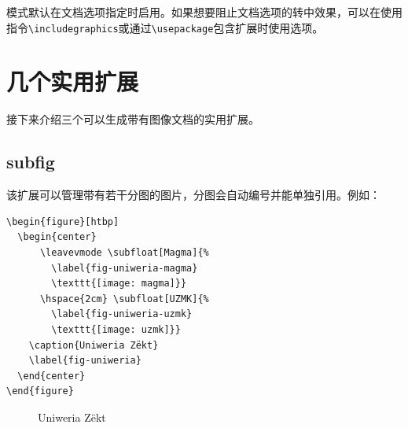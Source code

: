 模式默认在文档选项指定时启用。如果想要阻止文档选项的转中效果，可以在使用指令\verb|\includegraphics|或通过\verb|\usepackage|包含扩展时使用选项。

\section{几个实用扩展}

接下来介绍三个可以生成带有图像文档的实用扩展。

\subsection{\textsf{subfig}}

该扩展可以管理带有若干分图的图片，分图会自动编号并能单独引用。例如：

\begin{dmd}
\begin{verbatim}
\begin{figure}[htbp]
  \begin{center}
      \leavevmode \subfloat[Magma]{%
        \label{fig-uniweria-magma}
        \texttt{[image: magma]}}
      \hspace{2cm} \subfloat[UZMK]{%
        \label{fig-uniweria-uzmk}
        \texttt{[image: uzmk]}}
    \caption{Uniweria Zëkt}
    \label{fig-uniweria}
  \end{center}
\end{figure}
\end{verbatim}
\end{dmd}

\begin{figure}[htbp]
  \begin{center}
      \leavevmode {}
      \hspace{2cm} 
    \caption{Uniweria Zëkt}
    \label{fig-uniweria}
  \end{center}
\end{figure}

